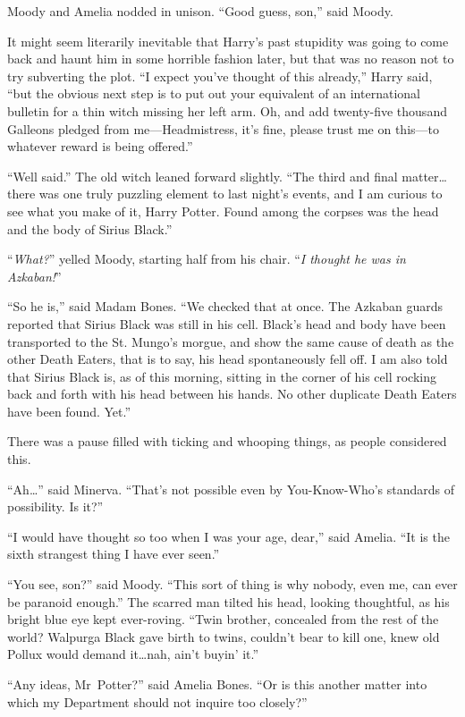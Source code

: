Moody and Amelia nodded in unison. “Good guess, son,” said Moody.

It might seem literarily inevitable that Harry’s past stupidity was going to come back and haunt him in some horrible fashion later, but that was no reason not to try subverting the plot. “I expect you’ve thought of this already,” Harry said, “but the obvious next step is to put out your equivalent of an international bulletin for a thin witch missing her left arm. Oh, and add twenty-five thousand Galleons pledged from me—Headmistress, it’s fine, please trust me on this—to whatever reward is being offered.”

“Well said.” The old witch leaned forward slightly. “The third and final matter…there was one truly puzzling element to last night’s events, and I am curious to see what you make of it, Harry Potter. Found among the corpses was the head and the body of Sirius Black.”

“\emph{What?}” yelled Moody, starting half from his chair. “\emph{I thought he was in Azkaban!}”

“So he is,” said Madam Bones. “We checked that at once. The Azkaban guards reported that Sirius Black was still in his cell. Black’s head and body have been transported to the St. Mungo’s morgue, and show the same cause of death as the other Death Eaters, that is to say, his head spontaneously fell off. I am also told that Sirius Black is, as of this morning, sitting in the corner of his cell rocking back and forth with his head between his hands. No other duplicate Death Eaters have been found. Yet.”

There was a pause filled with ticking and whooping things, as people considered this.

“Ah…” said Minerva. “That’s not possible even by You-Know-Who’s standards of possibility. Is it?”

“I would have thought so too when I was your age, dear,” said Amelia. “It is the sixth strangest thing I have ever seen.”

“You see, son?” said Moody. “This sort of thing is why nobody, even me, can ever be paranoid enough.” The scarred man tilted his head, looking thoughtful, as his bright blue eye kept ever-roving. “Twin brother, concealed from the rest of the world? Walpurga Black gave birth to twins, couldn’t bear to kill one, knew old Pollux would demand it…nah, ain’t buyin’ it.”

“Any ideas, Mr~Potter?” said Amelia Bones. “Or is this another matter into which my Department should not inquire too closely?”

